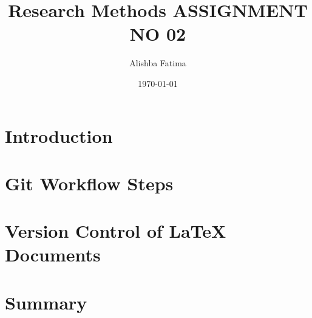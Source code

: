 \documentclass{article}
\title{Research Methods ASSIGNMENT NO 02 }
\author{Alishba Fatima}
\date{\today}
\begin{document}
\maketitle

\section{Introduction}

\section{Git Workflow Steps}

\section{Version Control of LaTeX Documents}

\section{Summary}
\end{document}
